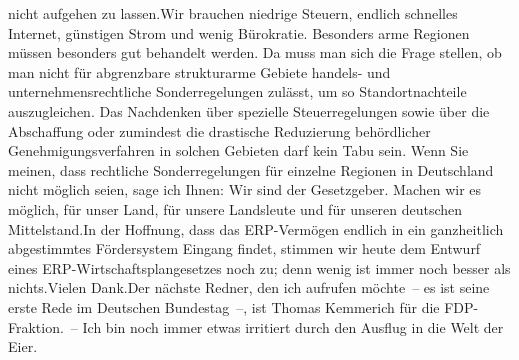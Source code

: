 \documentclass{article}
\begin{document}
nicht aufgehen zu lassen.Wir brauchen niedrige Steuern, endlich schnelles Internet, günstigen Strom und wenig Bürokratie. Besonders arme Regionen müssen besonders gut behandelt werden. Da muss man sich die Frage stellen, ob man nicht für abgrenzbare strukturarme Gebiete handels- und unternehmensrechtliche Sonderregelungen zulässt, um so Standortnachteile auszugleichen. Das Nachdenken über spezielle Steuerregelungen sowie über die Abschaffung oder zumindest die drastische Reduzierung behördlicher Genehmigungsverfahren in solchen Gebieten darf kein Tabu sein. Wenn Sie meinen, dass rechtliche Sonderregelungen für einzelne Regionen in Deutschland nicht möglich seien, sage ich Ihnen: Wir sind der Gesetzgeber. Machen wir es möglich, für unser Land, für unsere Landsleute und für unseren deutschen Mittelstand.In der Hoffnung, dass das ERP-Vermögen endlich in ein ganzheitlich abgestimmtes Fördersystem Eingang findet, stimmen wir heute dem Entwurf eines ERP-Wirtschaftsplangesetzes noch zu; denn wenig ist immer noch besser als nichts.Vielen Dank.Der nächste Redner, den ich aufrufen möchte – es ist seine erste Rede im Deutschen Bundestag –, ist Thomas Kemmerich für die FDP-Fraktion. – Ich bin noch immer etwas irritiert durch den Ausflug in die Welt der Eier.
\end{document}

